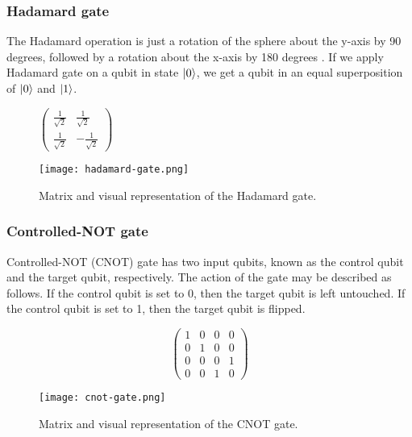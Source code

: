 \subsubsection{Hadamard gate}
The Hadamard operation is just a rotation of the sphere about the y-axis by 90 degrees, followed by a rotation about the x-axis by 180 degrees \cite{qc}. If we apply Hadamard gate on a qubit in state $\lvert0\rangle$, we get a qubit in an equal superposition of $\lvert0\rangle$ and $\lvert1\rangle$.
\begin{figure}[H]
    \centering
    \begin{minipage}{0.4\linewidth}
      \centering
      $\begin{pmatrix} 
        \frac{1}{\sqrt{2}} &  \frac{1}{\sqrt{2}}  \\
        \frac{1}{\sqrt{2}}  &  -\frac{1}{\sqrt{2}} 
        \end{pmatrix}$
      \vfill
    \end{minipage}
    \begin{minipage}{0.25\linewidth}
      \centering
      \texttt{[image: hadamard-gate.png]}
      \vfill
    \end{minipage}
    \caption{Matrix and visual representation of the Hadamard gate.}
\end{figure}

\subsubsection{Controlled-NOT gate} 
Controlled-NOT (CNOT) gate has two input qubits, known as the control qubit and the target qubit, respectively. The action of the gate may be described as follows. If the control qubit is set to 0, then the target qubit is left untouched. If the control qubit is set to 1, then the target qubit is flipped. \cite{qc}

\begin{figure}[H]
  \centering
  \begin{minipage}{0.4\linewidth}
    \centering
    $$\begin{pmatrix}
      1 & 0 & 0 & 0 \\
      0 & 1 & 0 & 0 \\
      0 & 0 & 0 & 1 \\
      0 & 0 & 1 & 0
  \end{pmatrix}$$
    \vfill
  \end{minipage}
  \begin{minipage}{0.25\linewidth}
    \centering
    \texttt{[image: cnot-gate.png]}
    \vfill
  \end{minipage}
  \caption{Matrix and visual representation of the CNOT gate.}
\end{figure}

